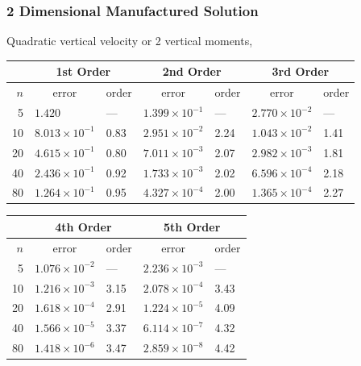 \documentclass[10pt]{beamer}
\begin{document}
\begin{frame}
  \frametitle{2 Dimensional Manufactured Solution}
  Quadratic vertical velocity or 2 vertical moments,
  \footnotesize
  \begin{table}
    \centering
    \begin{tabular}{r*{6}l}
      \toprule
            & \multicolumn{2}{c}{1st Order} & \multicolumn{2}{c}{2nd Order} & \multicolumn{2}{c}{3rd Order}                                              \\
      \midrule
      \(n\) & \multicolumn{1}{c}{error}     & order                         & \multicolumn{1}{c}{error}     & order & \multicolumn{1}{c}{error}  & order \\
      \midrule
      5     & \( 1.420 \)                   & ---                           & \( 1.399 \times 10^{-1} \)    & ---   & \( 2.770 \times 10^{-2} \) & --- \\
      10    & \( 8.013 \times 10^{-1} \)    & 0.83                          & \( 2.951 \times 10^{-2} \)    & 2.24  & \( 1.043 \times 10^{-2} \) & 1.41 \\
      20    & \( 4.615 \times 10^{-1} \)    & 0.80                          & \( 7.011 \times 10^{-3} \)    & 2.07  & \( 2.982 \times 10^{-3} \) & 1.81 \\
      40    & \( 2.436 \times 10^{-1} \)    & 0.92                          & \( 1.733 \times 10^{-3} \)    & 2.02  & \( 6.596 \times 10^{-4} \) & 2.18 \\
      80    & \( 1.264 \times 10^{-1} \)    & 0.95                          & \( 4.327 \times 10^{-4} \)    & 2.00  & \( 1.365 \times 10^{-4} \) & 2.27 \\
      \bottomrule
    \end{tabular}
  \end{table}
  \begin{table}
    \centering
    \begin{tabular}{r*{4}l}
      \toprule
            & \multicolumn{2}{c}{4th Order} & \multicolumn{2}{c}{5th Order}                                      \\
      \midrule
      \(n\) & \multicolumn{1}{c}{error}     & order                         & \multicolumn{1}{c}{error}  & order \\
      \midrule
      5     & \( 1.076 \times 10^{-2} \)    & ---                           & \( 2.236 \times 10^{-3} \) & ---   \\
      10    & \( 1.216 \times 10^{-3} \)    & 3.15                          & \( 2.078 \times 10^{-4} \) & 3.43  \\
      20    & \( 1.618 \times 10^{-4} \)    & 2.91                          & \( 1.224 \times 10^{-5} \) & 4.09  \\
      40    & \( 1.566 \times 10^{-5} \)    & 3.37                          & \( 6.114 \times 10^{-7} \) & 4.32  \\
      80    & \( 1.418 \times 10^{-6} \)    & 3.47                          & \( 2.859 \times 10^{-8} \) & 4.42  \\
      \bottomrule
    \end{tabular}
  \end{table}
\end{frame}
\end{document}
